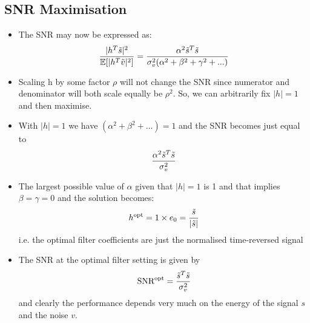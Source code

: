 \documentclass[12pt]{article}
\newcommand{\sigd}{\sigma^2}
\newcommand{\mexp}{\mathbb{E}}
\newcommand{\opt}{\textrm{opt}}
\begin{document}
\subsection{SNR Maximisation}
\begin{itemize}
    \item The SNR may now be expressed as:
    \[
    \frac{|h^T \Tilde{s}|^2}{\mexp[|h^T \Tilde{v}|^2]} = \frac{\alpha^2 \Tilde{s}^T \Tilde{s}}{\sigd_v(\alpha^2 + \beta^2 + \gamma^2 + ...)}
    \]
    \item Scaling h by some factor $\rho$ will not change the SNR since numerator and denominator will both scale equally be $\rho^2$. So, we can arbitrarily fix $|h|=1$ and then maximise.
    \item With $|h| = 1$ we have $(\alpha^2 + \beta^2 + ...) = 1$ and the SNR becomes just equal to 
    \[
    \frac{\alpha^2 \Tilde{s}^T \Tilde{s}}{\sigd_v}
    \]
    \item The largest possible value of $\alpha$ given that $|h|=1$ is 1 and that implies $\beta=\gamma = 0$ and the solution becomes:
    \[
    h^{\opt} = 1 \times e_0 = \frac{\Tilde{s}}{|\Tilde{s}|}
    \]
    i.e. the optimal filter coefficients are just the normalised time-reversed signal
    \item The SNR at the optimal filter setting is given by
    \[
    \textrm{SNR}^{\opt}=\frac{\Tilde{s}^T \Tilde{s}}{\sigd_v}
    \]
    and clearly the performance depends very much on the energy of the signal $s$ and the noise $v$.
\end{itemize}
\end{document}
